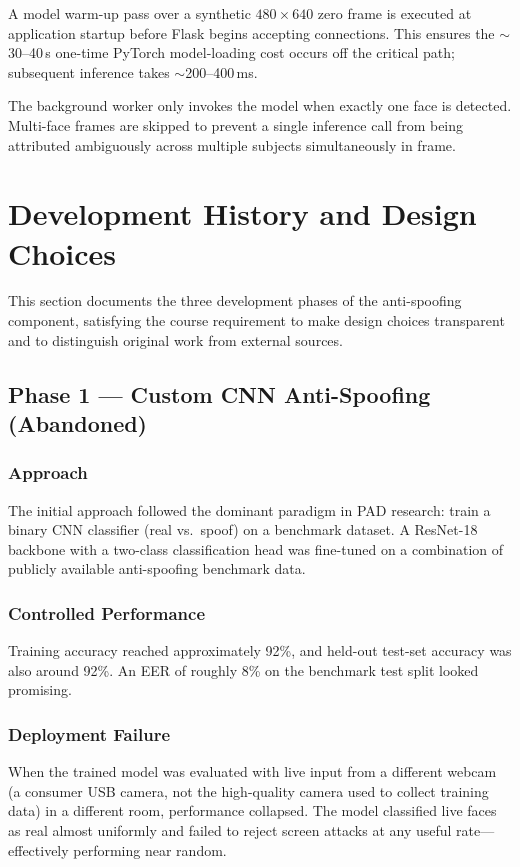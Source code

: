 \documentclass[11pt,a4paper]{article}
\begin{document}
A model warm-up pass over a synthetic $480\times 640$ zero frame is executed at
application startup before Flask begins accepting connections.
This ensures the $\sim$30--40\,s one-time PyTorch model-loading cost occurs off
the critical path; subsequent inference takes $\sim$200--400\,ms.

The background worker only invokes the model when exactly one face is detected.
Multi-face frames are skipped to prevent a single inference call from being
attributed ambiguously across multiple subjects simultaneously in frame.

\section{Development History and Design Choices}
\label{sec:devhistory}

This section documents the three development phases of the anti-spoofing component,
satisfying the course requirement to make design choices transparent and to
distinguish original work from external sources.

\subsection{Phase 1 --- Custom CNN Anti-Spoofing (Abandoned)}

\subsubsection{Approach}
The initial approach followed the dominant paradigm in PAD research: train a binary
CNN classifier (real vs.\ spoof) on a benchmark dataset.
A ResNet-18 backbone with a two-class classification head was fine-tuned on a
combination of publicly available anti-spoofing benchmark data.

\subsubsection{Controlled Performance}
Training accuracy reached approximately 92\%, and held-out test-set accuracy was
also around 92\%.
An EER of roughly 8\% on the benchmark test split looked promising.

\subsubsection{Deployment Failure}
When the trained model was evaluated with live input from a different webcam (a
consumer USB camera, not the high-quality camera used to collect training data)
in a different room, performance collapsed.
The model classified live faces as real almost uniformly and failed to reject
screen attacks at any useful rate---effectively performing near random.
\end{document}
